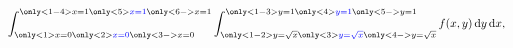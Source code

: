 \begin{frame}
{    
  }
  \vspace{-0.5cm}
  \begin{equation*}
      \int_{\only<1>{x =
      0}\only<2>{\textcolor{blue}{x=0}}\only<3->{x=0}}^{\only<1-4>{x =
  1}\only<5>{\textcolor{blue}{x=1}}\only<6->{x=1}} \int_{\only<1-2>{y =
  \sqrt{x}}\only<3>{\textcolor{blue}{y=\sqrt{x}}}\only<4->{y=\sqrt{x}}}^{\only<1-3>{y
  = 1}\only<4>{\textcolor{blue}{y=1}}\only<5->{y=1}} f(x,y) \dy \dx,
  \end{equation*}
\end{frame}

